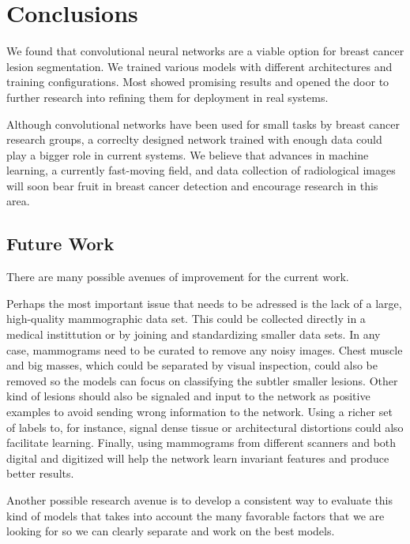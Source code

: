 \chapter{Conclusions}
\label{ch:Conclusions}
We found that convolutional neural networks are a viable option for breast cancer lesion segmentation. We trained various models with different architectures and training configurations. Most showed promising results and opened the door to further research into refining them for deployment in real systems. 

Although convolutional networks have been used for small tasks by breast cancer research groups, a correclty designed network trained with enough data could play a bigger role in current systems. We believe that advances in machine learning, a currently fast-moving field, and data collection of radiological images will soon bear fruit in breast cancer detection and encourage research in this area. 

\section{Future Work}
There are many possible avenues of improvement for the current work.

Perhaps the most important issue that needs to be adressed is the lack of a large, high-quality mammographic data set. This could be collected directly in a medical instittution or by joining and standardizing smaller data sets. In any case, mammograms need to be curated to remove any noisy images. Chest muscle and big masses, which could be separated by visual inspection, could also be removed so the models can focus on classifying the subtler smaller lesions. Other kind of lesions should also be signaled and input to the network as positive examples to avoid sending wrong information to the network. Using a richer set of labels to, for instance, signal dense tissue or architectural distortions could also facilitate learning. Finally, using mammograms from different scanners and both digital and digitized will help the network learn invariant features and produce better results.

Another possible research avenue is to develop a consistent way to evaluate this kind of models that takes into account the many favorable factors that we are looking for so we can clearly separate and work on the best models.
